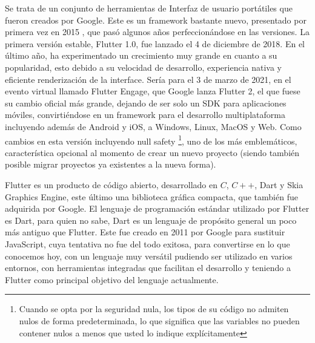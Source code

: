 Se trata de un conjunto de herramientas de Interfaz de usuario portátiles que fueron creados por Google. Este es un framework bastante nuevo, presentado por primera vez en 2015 , que pasó algunos años perfeccionándose en las versiones. La primera versión estable, Flutter 1.0, fue lanzado el 4 de diciembre de 2018. En el último año, ha experimentado un crecimiento muy grande en cuanto a su popularidad, esto debido a su velocidad de desarrollo, experiencia nativa y eficiente renderización de la interface. Sería para el 3 de marzo de 2021, en el evento virtual llamado Flutter Engage, que Google lanza Flutter 2, el que fuese su cambio oficial más grande, dejando de ser solo un SDK para aplicaciones móviles, convirtiéndose en un framework para el desarrollo multiplataforma incluyendo además de Android y iOS, a Windows, Linux, MacOS y Web. Como cambios en esta versión incluyendo null safety \footnote{Cuando se opta por la seguridad nula, los tipos de su código no admiten nulos de forma predeterminada, lo que significa que las variables no pueden contener nulos a menos que usted lo indique explícitamente}, uno de los más emblemáticos, característica opcional al momento de crear un nuevo proyecto (siendo también posible migrar proyectos ya existentes a la nueva forma).

Flutter es un producto de código abierto, desarrollado en $C$, $C++$, Dart y Skia Graphics Engine, este último una biblioteca gráfica compacta, que también fue adquirida por Google. El lenguaje de programación estándar utilizado por Flutter es Dart, para quien no sabe, Dart es un lenguaje de propósito general un poco más antiguo que Flutter. Este fue creado en 2011 por Google para sustituir JavaScript, cuya tentativa no fue del todo exitosa, para convertirse en lo que conocemos hoy, con un lenguaje muy versátil pudiendo ser utilizado en varios entornos, con herramientas integradas que facilitan el desarrollo y teniendo a Flutter como principal objetivo del lenguaje actualmente.

